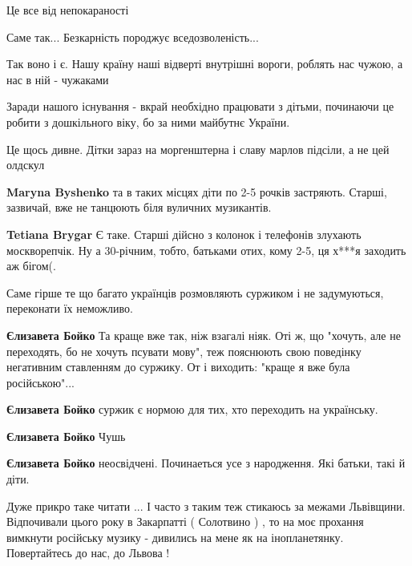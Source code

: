 \begin{itemize}
Це все від непокараності

\begin{itemize} %
Саме так... Безкарність породжує вседозволеність...
\end{itemize} %

Так воно і є. Нашу країну наші відверті внутрішні вороги, роблять нас чужою, а нас в ній - чужаками

Заради нашого існування - вкрай необхідно працювати з дітьми, починаючи це робити з дошкільного віку, бо за ними майбутнє України.

Це щось дивне. Дітки зараз на моргенштерна і славу марлов підсіли, а не цей олдскул

\begin{itemize} %
\textbf{Maryna Byshenko} та в таких місцях діти по 2-5 рочків застряють. Старші, зазвичай, вже не танцюють біля вуличних музикантів.

\textbf{Tetiana Brygar} Є таке. Старші дійсно з колонок і телефонів злухають москворепчік. Ну а 30-річним, тобто, батьками отих, кому 2-5, ця х***я заходить аж бігом(.
\end{itemize} %

Саме гірше те що багато українців розмовляють суржиком і не задумуються,
переконати їх неможливо.

\begin{itemize} %
\textbf{Єлизавета Бойко} Та краще вже так, ніж взагалі ніяк. Оті ж, що "хочуть, але не переходять, бо не хочуть псувати мову", теж пояснюють свою поведінку негативним ставленням до суржику. От і виходить: "краще я вже була російською"...

\textbf{Єлизавета Бойко} суржик є нормою для тих, хто переходить на українську.

\textbf{Єлизавета Бойко}
Чушь

\textbf{Єлизавета Бойко} неосвідчені.
Починаеться усе з народження.
Які батьки, такі й діти.
\end{itemize} %


Дуже прикро таке читати ... І часто з таким теж стикаюсь за межами Львівщини.
Відпочивали цього року в Закарпатті ( Солотвино ) , то на моє прохання вимкнути
російську музику - дивились на мене як на інопланетянку. Повертайтесь до нас,
до Львова !


\end{itemize}
